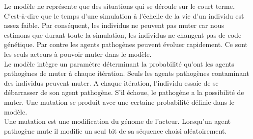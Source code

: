 Le modèle ne représente que des situations qui se déroule sur le court terme. C'est-à-dire que le temps d'une simulation à l'échelle de la vie d'un individu est assez faible. Par conséquent, les individus ne peuvent pas muter car nous estimons que durant toute la simulation, les individus ne changent pas de code génétique. Par contre les agents pathogènes peuvent évoluer rapidement. Ce sont les seuls acteurs à pouvoir muter dans le modèle.\\

Le modèle intègre un paramètre déterminant la probabilité qu'ont les agents pathogènes de muter à chaque itération. Seuls les agents pathogènes contaminant des individus peuvent muter. A chaque itération, l'individu essaie de se débarrasser de son agent pathogène. S'il échoue, le pathogène a la possibilité de muter. Une mutation se produit avec une certaine probabilité définie dans le modèle.\\

Une mutation est une modification du génome de l'acteur. Lorsqu'un agent pathogène mute il modifie un seul bit de sa séquence choisi aléatoirement. 